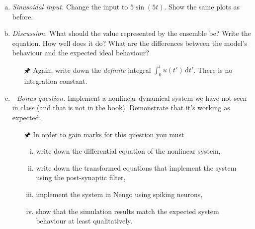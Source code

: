 \begin{enumerate}[a)]
\begin{itemize}
		\end{itemize}
		\item {} \emph{Sinusoidal input.} Change the input to $5\sin(5t)$. Show the same plots as before.
		\item {} \emph{Discussion.} What should the value represented by the ensemble be? Write the equation. How well does it do? What are the differences between the model's behaviour and the expected ideal behaviour?
		\begin{itemize}
			\item[{\symbolfont 🖈}] Again, write down the \emph{definite} integral $\int_0^t u(t') \,\mathrm{d}t'$. There is no integration constant.
\end{itemize}
		\item {} \textit{{\symbolfont 🌟} Bonus question.} Implement a nonlinear dynamical system we have not seen in class (and that is not in the book). Demonstrate that it's working as expected.
		\begin{itemize}
			\item[{\symbolfont 🖈}] In order to gain marks for this question you must
			\begin{enumerate}[(i)]
				\item write down the differential equation of the nonlinear system,
				\item write down the transformed equations that implement the system using the post-synaptic filter,
				\item implement the system in Nengo using spiking neurons,
				\item show that the simulation results match the expected system behaviour at least qualitatively.
			\end{enumerate}
		\end{itemize}
	\end{enumerate}


